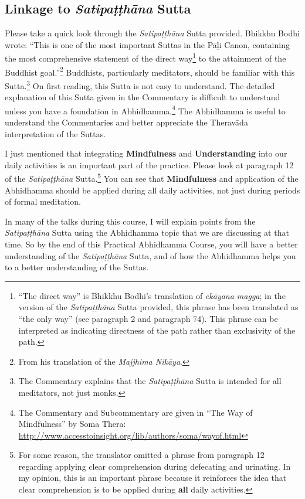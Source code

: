 \subsection*{Linkage to \textit{Satipaṭṭhāna} Sutta}

Please take a quick look through the \textit{Satipaṭṭhāna} Sutta provided. Bhikkhu Bodhi wrote: “This is one of the most important Suttas in the Pāḷi Canon, containing the most comprehensive statement of the direct way\footnote{“The direct way” is Bhikkhu Bodhi's translation of \textit{ekāyana magga}; in the version of the \textit{Satipaṭṭhāna} Sutta provided, this phrase has been translated as “the only way” (see paragraph 2 and paragraph 74). This phrase can be interpreted as indicating directness of the path rather than exclusivity of the path.} to the attainment of the Buddhist goal.”\footnote{From his translation of the \textit{Majjhima Nikāya}.} Buddhists, particularly meditators, should be familiar with this Sutta.\footnote{The Commentary explains that the \textit{Satipaṭṭhāna} Sutta is intended for all meditators, not just monks.} On first reading, this Sutta is not easy to understand. The detailed explanation of this Sutta given in the Commentary is difficult to understand unless you have a foundation in Abhidhamma.\footnote{The Commentary and Subcommentary are given in “The Way of Mindfulness” by Soma Thera: \url{http://www.accesstoinsight.org/lib/authors/soma/wayof.html}} The Abhidhamma is useful to understand the Commentaries and better appreciate the Theravāda interpretation of the Suttas.

I just mentioned that integrating \textbf{Mindfulness} and \textbf{Understanding} into our daily activities is an important part of the practice. Please look at paragraph 12 of the \textit{Satipaṭṭhāna} Sutta.\footnote{For some reason, the translator omitted a phrase from paragraph 12 regarding applying clear comprehension during defecating and urinating. In my opinion, this is an important phrase because it reinforces the idea that clear comprehension is to be applied during \textbf{all} daily activities.} You can see that \textbf{Mindfulness} and application of the Abhidhamma should be applied during all daily activities, not just during periods of formal meditation.

In many of the talks during this course, I will explain points from the \textit{Satipaṭṭhāna} Sutta using the Abhidhamma topic that we are discussing at that time. So by the end of this Practical Abhidhamma Course, you will have a better understanding of the \textit{Satipaṭṭhāna} Sutta, and of how the Abhidhamma helps you to a better understanding of the Suttas.

